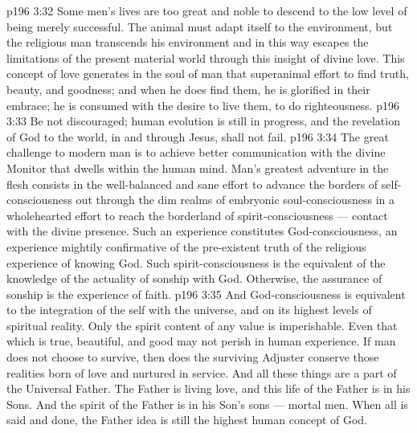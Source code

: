 \vs p196 3:32 Some men’s lives are too great and noble to descend to the low level of being merely successful. The animal must adapt itself to the environment, but the religious man transcends his environment and in this way escapes the limitations of the present material world through this insight of divine love. This concept of love generates in the soul of man that superanimal effort to find truth, beauty, and goodness; and when he does find them, he is glorified in their embrace; he is consumed with the desire to live them, to do righteousness.
\vs p196 3:33 Be not discouraged; human evolution is still in progress, and the revelation of God to the world, in and through Jesus, shall not fail.
\vs p196 3:34 The great challenge to modern man is to achieve better communication with the divine Monitor that dwells within the human mind. Man’s greatest adventure in the flesh consists in the well\hyp{}balanced and sane effort to advance the borders of self\hyp{}consciousness out through the dim realms of embryonic soul\hyp{}consciousness in a wholehearted effort to reach the borderland of spirit\hyp{}consciousness --- contact with the divine presence. Such an experience constitutes God\hyp{}consciousness, an experience mightily confirmative of the pre\hyp{}existent truth of the religious experience of knowing God. Such spirit\hyp{}consciousness is the equivalent of the knowledge of the actuality of sonship with God. Otherwise, the assurance of sonship is the experience of faith.
\vs p196 3:35 And God\hyp{}consciousness is equivalent to the integration of the self with the universe, and on its highest levels of spiritual reality. Only the spirit content of any value is imperishable. Even that which is true, beautiful, and good may not perish in human experience. If man does not choose to survive, then does the surviving Adjuster conserve those realities born of love and nurtured in service. And all these things are a part of the Universal Father. The Father is living love, and this life of the Father is in his Sons. And the spirit of the Father is in his Son’s sons --- mortal men. When all is said and done, the Father idea is still the highest human concept of God.
\quizlink
